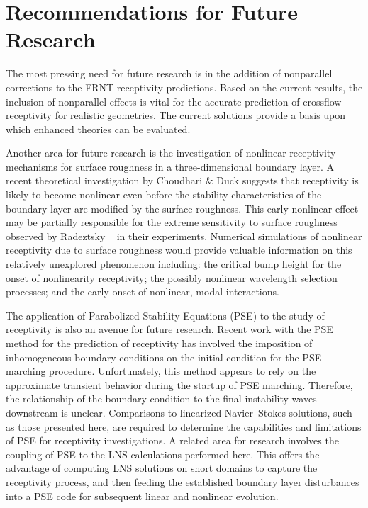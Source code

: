 \section{Recommendations for Future Research}

The most pressing need for future research is in the addition of nonparallel
corrections to the FRNT receptivity predictions.  Based on the current
results, the inclusion of nonparallel effects is vital for the accurate
prediction of crossflow receptivity for realistic geometries.  The current
solutions provide a basis upon which enhanced theories can be evaluated.

Another area for future research is the investigation of nonlinear receptivity
mechanisms for surface roughness in a three-dimensional boundary layer.  A
recent theoretical investigation by Choudhari \& Duck \cite{ChDu:96} suggests
that receptivity is likely to become nonlinear even before the stability
characteristics of the boundary layer are modified by the surface roughness.
This early nonlinear effect may be partially responsible for the extreme
sensitivity to surface roughness observed by Radeztsky \etal\ \cite{RaReSa:93}
in their experiments.  Numerical simulations of nonlinear receptivity due to
surface roughness would provide valuable information on this relatively
unexplored phenomenon including: the critical bump height for the onset of
nonlinearity receptivity; the possibly nonlinear wavelength selection
processes; and the early onset of nonlinear, modal interactions.

The application of Parabolized Stability Equations (PSE) to the study of
receptivity is also an avenue for future research.  Recent work with the PSE
method for the prediction of receptivity \cite{HeLi:93} has involved the
imposition of inhomogeneous boundary conditions on the initial condition for
the PSE marching procedure.  Unfortunately, this method appears to rely on the
approximate transient behavior during the startup of PSE marching.  Therefore,
the relationship of the boundary condition to the final instability waves
downstream is unclear.  Comparisons to linearized Navier--Stokes solutions,
such as those presented here, are required to determine the capabilities and
limitations of PSE for receptivity investigations.  A related area for
research involves the coupling of PSE to the LNS calculations performed here.
This offers the advantage of computing LNS solutions on short domains to
capture the receptivity process, and then feeding the established boundary
layer disturbances into a PSE code for subsequent linear and nonlinear
evolution.

